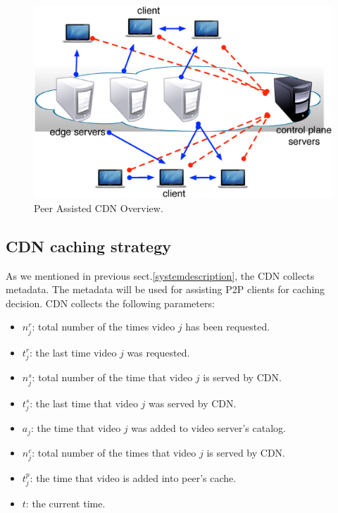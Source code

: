\documentclass[conference]{IEEEtran}
\begin{document}
\begin{figure}[th]
\begin{center}
\includegraphics[scale=0.3]{graphs/netsession.eps}
\end{center}
\caption{Peer Assisted CDN Overview.}
\label{fig:p2pcdnoverview}
\vspace{-2mm}
\end{figure} 




\subsection{CDN caching strategy}\label{cdncachingstrategy}
As we mentioned in previous sect.\ref{systemdescription}, the CDN collects metadata.
The metadata will be used for assisting P2P clients for caching decision. 
CDN collects the following parameters:
\begin{itemize}
\item $n_j^r$: total number of the times video $j$ has been requested.  
\item $t_j^r$: the last time video $j$ was requested.
\item $n_j^s$: total number of the time that video $j$ is served by CDN.
\item $t_j^s$: the last time that video $j$ was served by CDN.
\item $a_j$: the time that video $j$ was added to video server's catalog.
\item $n_j^c$: total number of the times that video $j$ is served by CDN.
\item $t_j^p$: the time that video  is added into peer's cache.
\item $t$: the current time.
\end{itemize}
\end{document}
